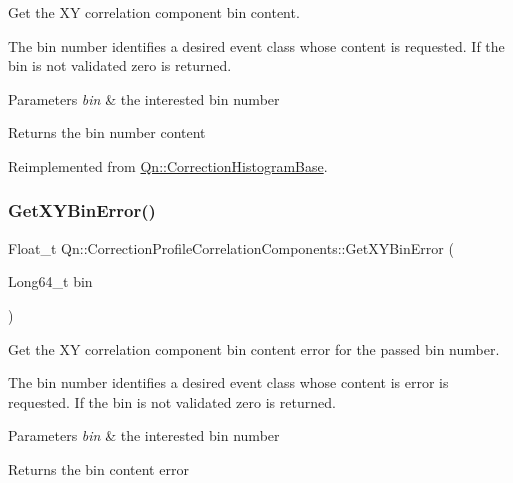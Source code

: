 Get the XY correlation component bin content.

The bin number identifies a desired event class whose content is requested. If the bin is not validated zero is returned.


\begin{DoxyParams}{Parameters}
{\em bin} & the interested bin number \\
\hline
\end{DoxyParams}
\begin{DoxyReturn}{Returns}
the bin number content 
\end{DoxyReturn}


Reimplemented from \mbox{\hyperlink{classQn_1_1CorrectionHistogramBase_aa631b6234a81dbe46b29a95fda339b69}{Qn\+::\+Correction\+Histogram\+Base}}.

\mbox{\label{classQn_1_1CorrectionProfileCorrelationComponents_a58d233f34fbbf505d6abb2cf3236c60f}} 
\subsubsection{\texorpdfstring{Get\+X\+Y\+Bin\+Error()}{GetXYBinError()}}
{\footnotesize\ttfamily Float\+\_\+t Qn\+::\+Correction\+Profile\+Correlation\+Components\+::\+Get\+X\+Y\+Bin\+Error (\begin{DoxyParamCaption}\item[{Long64\+\_\+t}]{bin }\end{DoxyParamCaption})\hspace{0.3cm}{\ttfamily [virtual]}}

Get the XY correlation component bin content error for the passed bin number.

The bin number identifies a desired event class whose content is error is requested. If the bin is not validated zero is returned.


\begin{DoxyParams}{Parameters}
{\em bin} & the interested bin number \\
\hline
\end{DoxyParams}
\begin{DoxyReturn}{Returns}
the bin content error 
\end{DoxyReturn}


